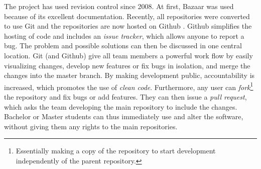 The \hisparc project has used revision control since 2008.  At first, Bazaar
\cite{Bazaar} was used because of its excellent documentation.  Recently, all
repositories were converted to use Git \cite{Git} and the repositories are now
hosted on Github \cite{github}.  Github simplifies the hosting of code and
includes an \emph{issue tracker}, which allows anyone to report a bug.
The problem and possible solutions can then be discussed in one central
location.  Git (and Github) give all team members a powerful work flow by easily
visualizing changes, develop new features or fix bugs in isolation, and merge
the changes into the master branch.  By making development public,
accountability is increased, which promotes the use of \emph{clean code}.
Furthermore, any user can \emph{fork}\footnote{Essentially making a copy of the
repository to start development independently of the parent repository.} the
repository and fix bugs or add features.  They can then issue a \emph{pull
request}, which asks the team developing the main repository to include the
changes.  Bachelor or Master students can thus immediately use and alter the
\hisparc software, without giving them any rights to the main repositories.

